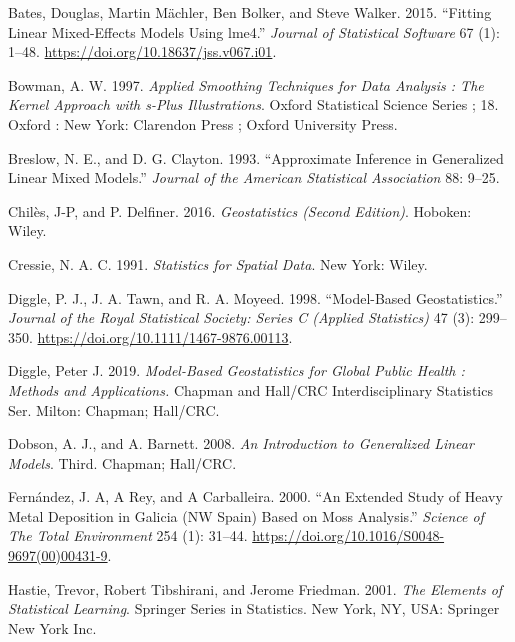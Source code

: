\documentclass[
  letterpaper,
]{krantz}
\newlength{\cslhangindent}
\newlength{\cslentryspacingunit} %
\newenvironment{CSLReferences}[2] %
 {%
  \setlength{\parindent}{0pt}
  \ifodd #1
  \let\oldpar\par
  \def\par{\hangindent=\cslhangindent\oldpar}
  \fi
  \setlength{\parskip}{#2\cslentryspacingunit}
 }%
 {}
\begin{document}
\hypertarget{refs}{}
\begin{CSLReferences}{1}{0}
\leavevmode{}%
Bates, Douglas, Martin Mächler, Ben Bolker, and Steve Walker. 2015.
{``Fitting Linear Mixed-Effects Models Using {lme4}.''} \emph{Journal of
Statistical Software} 67 (1): 1--48.
\url{https://doi.org/10.18637/jss.v067.i01}.

\leavevmode{}%
Bowman, A. W. 1997. \emph{Applied Smoothing Techniques for Data Analysis
: The Kernel Approach with s-Plus Illustrations}. Oxford Statistical
Science Series ; 18. Oxford : New York: Clarendon Press ; Oxford
University Press.

\leavevmode{}%
Breslow, N. E., and D. G. Clayton. 1993. {``Approximate Inference in
Generalized Linear Mixed Models.''} \emph{Journal of the American
Statistical Association} 88: 9--25.

\leavevmode{}%
Chilès, J-P, and P. Delfiner. 2016. \emph{Geostatistics (Second
Edition)}. Hoboken: Wiley.

\leavevmode{}%
Cressie, N. A. C. 1991. \emph{Statistics for Spatial Data}. New York:
Wiley.

\leavevmode{}%
Diggle, P. J., J. A. Tawn, and R. A. Moyeed. 1998. {``Model-Based
Geostatistics.''} \emph{Journal of the Royal Statistical Society: Series
C (Applied Statistics)} 47 (3): 299--350.
\url{https://doi.org/10.1111/1467-9876.00113}.

\leavevmode{}%
Diggle, Peter J. 2019. \emph{Model-Based Geostatistics for Global Public
Health : Methods and Applications.} Chapman and Hall/CRC
Interdisciplinary Statistics Ser. Milton: Chapman; Hall/CRC.

\leavevmode{}%
Dobson, A. J., and A. Barnett. 2008. \emph{An Introduction to
Generalized Linear Models}. Third. Chapman; Hall/CRC.

\leavevmode{}%
Fernández, J. A, A Rey, and A Carballeira. 2000. {``An Extended Study of
Heavy Metal Deposition in Galicia (NW Spain) Based on Moss Analysis.''}
\emph{Science of The Total Environment} 254 (1): 31--44.
\url{https://doi.org/10.1016/S0048-9697(00)00431-9}.

\leavevmode{}%
Hastie, Trevor, Robert Tibshirani, and Jerome Friedman. 2001. \emph{The
Elements of Statistical Learning}. Springer Series in Statistics. New
York, NY, USA: Springer New York Inc.


\end{CSLReferences}
\end{document}
